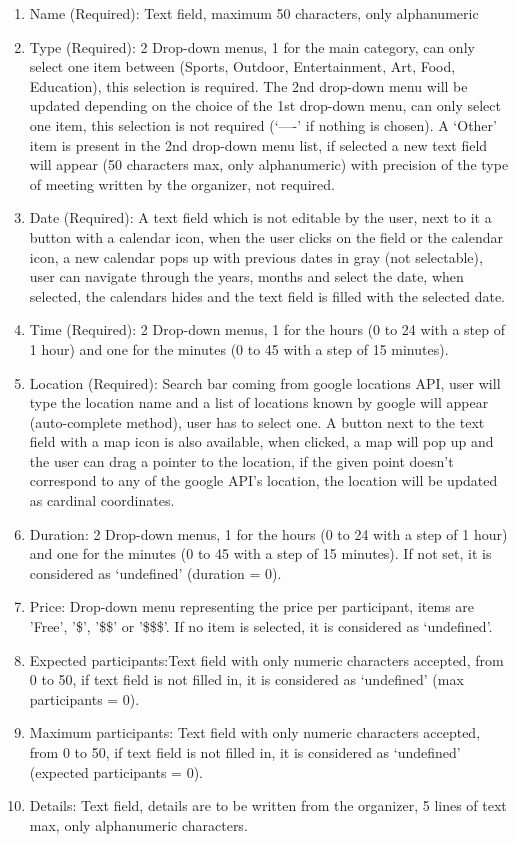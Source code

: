 \documentclass[conference]{IEEEtran}
\begin{document}
\begin{enumerate}
    \item Name (Required): Text field, maximum 50 characters, only alphanumeric
    \item Type (Required): 2 Drop-down menus, 1 for the main category, can only select one item between (Sports, Outdoor, Entertainment, Art, Food, Education), this selection is required.
    The 2nd drop-down menu will be updated depending on the choice of the 1st drop-down menu, can only select one item, this selection is not required (‘----’ if nothing is chosen).
    A ‘Other’ item is present in the 2nd drop-down menu list, if selected a new text field will appear (50 characters max, only alphanumeric) with precision of the type of meeting written by the organizer, not required.
    \item Date (Required): A text field which is not editable by the user, next to it a button with a calendar icon, when the user clicks on the field or the calendar icon, a new calendar pops up with previous dates in gray (not selectable), user can navigate through the years, months and select the date, when selected, the calendars hides and the text field is filled with the selected date.
    \item Time (Required): 2 Drop-down menus, 1 for the hours (0 to 24 with a step of 1 hour) and one for the minutes (0 to 45 with a step of 15 minutes).
    \item Location (Required): Search bar coming from google locations API, user will type the location name and a list of locations known by google will appear (auto-complete method), user has to select one.
    A button next to the text field with a map icon is also available, when clicked, a map will pop up and the user can drag a pointer to the location, if the given point doesn’t correspond to any of the google API’s location, the location will be updated as cardinal coordinates.
    \item Duration: 2 Drop-down menus, 1 for the hours (0 to 24 with a step of 1 hour) and one for the minutes (0 to 45 with a step of 15 minutes).
    If not set, it is considered as ‘undefined’ (duration = 0).
    \item Price: Drop-down menu representing the price per participant, items are 'Free', '\$', '\$\$' or '\$\$\$'.
    If no item is selected, it is considered as ‘undefined’.
    \item Expected participants:Text field with only numeric characters accepted, from 0 to 50, if text field is not filled in, it is considered as ‘undefined’ (max participants = 0).
    \item Maximum participants: Text field with only numeric characters accepted, from 0 to 50, if text field is not filled in, it is considered as ‘undefined’ (expected participants = 0).
    \item Details: Text field, details are to be written from the organizer, 5 lines of text max, only alphanumeric characters.
\end{enumerate}
\end{document}
